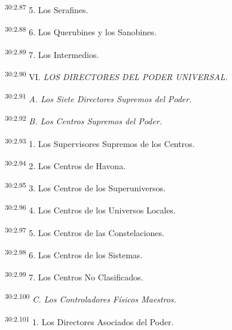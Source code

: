 \par
\textsuperscript{30:2.87} 5. Los Serafines.

\par
\textsuperscript{30:2.88} 6. Los Querubines y los Sanobines.

\par
\textsuperscript{30:2.89} 7. Los Intermedios.

\par
\textsuperscript{30:2.90} VI. \textit{LOS DIRECTORES DEL PODER UNIVERSAL.}

\par
\textsuperscript{30:2.91} \textit{A. Los Siete Directores Supremos del Poder.}

\par
\textsuperscript{30:2.92} \textit{B. Los Centros Supremos del Poder.}

\par
\textsuperscript{30:2.93} 1. Los Supervisores Supremos de los Centros.

\par
\textsuperscript{30:2.94} 2. Los Centros de Havona.

\par
\textsuperscript{30:2.95} 3. Los Centros de los Superuniversos.

\par
\textsuperscript{30:2.96} 4. Los Centros de los Universos Locales.

\par
\textsuperscript{30:2.97} 5. Los Centros de las Constelaciones.

\par
\textsuperscript{30:2.98} 6. Los Centros de los Sistemas.

\par
\textsuperscript{30:2.99} 7. Los Centros No Clasificados.

\par
\textsuperscript{30:2.100} \textit{C. Los Controladores Físicos Maestros.}

\par
\textsuperscript{30:2.101} 1. Los Directores Asociados del Poder.

